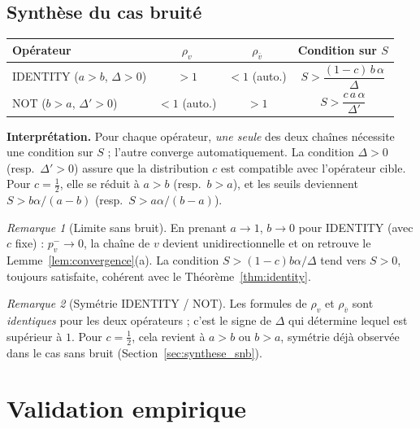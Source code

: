 \documentclass[12pt,a4paper]{article}
\theoremstyle{remark}
\newtheorem{remark}{Remarque}[section]
\newcommand{\vbar}{\bar{v}}
\begin{document}
\subsection{Synthèse du cas bruité}

\begin{center}
\renewcommand{\arraystretch}{2.2}
\begin{tabular}{lccc}
\toprule
Opérateur & $\rho_v$ & $\rho_{\vbar}$ & Condition sur $S$ \\
\midrule
IDENTITY ($a{>}b$, $\Delta{>}0$)
  & $> 1$
  & $< 1$ \small(auto.)
  & $S > \dfrac{(1-c)\,b\,\alpha}{\Delta}$ \\[8pt]
NOT ($b{>}a$, $\Delta'{>}0$)
  & $< 1$ \small(auto.)
  & $> 1$
  & $S > \dfrac{c\,a\,\alpha}{\Delta'}$ \\
\bottomrule
\end{tabular}
\end{center}

\textbf{Interprétation.} Pour chaque opérateur, \emph{une seule} des deux chaînes nécessite
une condition sur $S$ ; l'autre converge automatiquement.
La condition $\Delta > 0$ (resp.\ $\Delta' > 0$) assure que la distribution $c$ est
compatible avec l'opérateur cible.
Pour $c = \tfrac{1}{2}$, elle se réduit à $a > b$ (resp.\ $b > a$),
et les seuils deviennent $S > b \alpha/(a-b)$ (resp.\ $S > a \alpha/(b-a)$).

\begin{remark}[Limite sans bruit]
En prenant $a\to 1$, $b\to 0$ pour IDENTITY (avec $c$ fixe) :
$p^-_v \to 0$, la chaîne de $v$ devient unidirectionnelle et on retrouve
le Lemme~\ref{lem:convergence}(a).
La condition $S > (1-c)b \alpha/\Delta$ tend vers $S > 0$, toujours satisfaite,
cohérent avec le Théorème~\ref{thm:identity}.
\end{remark}

\begin{remark}[Symétrie IDENTITY / NOT]
Les formules de $\rho_v$ et $\rho_{\vbar}$ sont \emph{identiques} pour les deux opérateurs ;
c'est le signe de $\Delta$ qui détermine lequel est supérieur à $1$.
Pour $c = \tfrac{1}{2}$, cela revient à $a > b$ ou $b > a$,
symétrie déjà observée dans le cas sans bruit (Section~\ref{sec:synthese_snb}).
\end{remark}

\section{Validation empirique}
\end{document}
